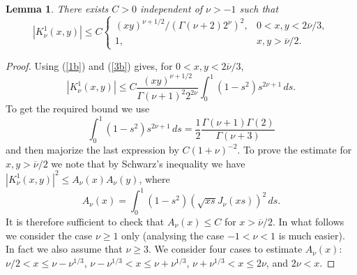 \documentclass[leqno,a4paper]{amsart}
\newtheorem{Lem}{Lemma}
\newcommand{\overnu}{\overline{\nu}}
\begin{document}
\begin{Lem}
\label{Lem:L1}
There exists $C>0$ independent of $\nu>-1$ such that
\begin{equation*}
\left|K_\nu^1(x,y)\right|\le C
\begin{cases}
(xy)^{\nu+1/2}/(\Gamma(\nu+2)2^{\nu})^2,& 0<x,y<2\overnu/3,\\
1,& x,y>\overnu/2.
\end{cases}
\end{equation*}
\end{Lem}

\begin{proof}
Using (\ref{1b}) and (\ref{3b}) gives, for $0<x,y<2\overnu/3$,
\begin{equation*}
\left|K_\nu^1(x,y)\right| \le C
\frac{(xy)^{\nu+1/2}}{\Gamma(\nu+1)^2 2^{2\nu}} \int_0^1 (1-s^2)
s^{2\nu+1}\,ds.
\end{equation*}
To get the required bound we use
\begin{equation*}
\int_0^1 (1-s^2)s^{2\nu+1}\,ds =
\frac12\frac{\Gamma(\nu+1)\Gamma(2)}{\Gamma(\nu+3)}
\end{equation*}
and then majorize the last expression by $C(1+\nu)^{-2}$.
To prove the estimate for $x,y>\overnu/2$ we note that
by Schwarz's inequality we have $|K_\nu^1(x,y)|^2 \le A_{\nu}(x)A_{\nu}(y)$,
where
$$
A_{\nu}(x) = \int_0^1(1-s^2)(\sqrt{xs}J_{\nu}(xs))^2\,ds.
$$
It is therefore sufficient to check that $A_{\nu}(x)\le C$
for $x>\overnu/2$. In what follows we consider the case $\nu\ge 1$
only (analysing the case $-1<\nu<1$ is much easier). In fact we also assume
that $\nu\ge3$.
We consider four cases to estimate $A_\nu(x)$: $\nu/2<x\le \nu-\nu^{1/3}$,
$\nu-\nu^{1/3}<x\le \nu+\nu^{1/3}$, $\nu+\nu^{1/3}<x\le 2\nu$, and
$2\nu<x$.


\end{proof}
\end{document}
